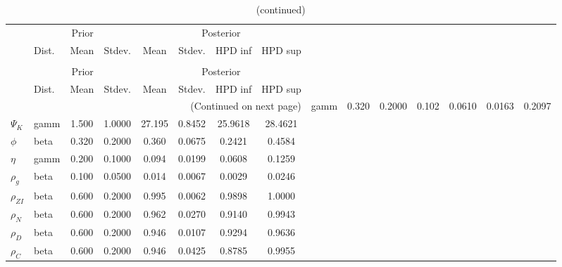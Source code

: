  
\begin{center}
\begin{longtable}{llcccccc} 
\caption{Results from Metropolis-Hastings (parameters)}
 \label{Table:MHPosterior:1}\\
\toprule 
  & \multicolumn{3}{c}{Prior}  &  \multicolumn{4}{c}{Posterior} \\
  \cmidrule(r{.75em}){2-4} \cmidrule(r{.75em}){5-8}
  & Dist. & Mean  & Stdev. & Mean & Stdev. & HPD inf & HPD sup\\
\midrule \endfirsthead 
\caption{(continued)}\\\toprule 
  & \multicolumn{3}{c}{Prior}  &  \multicolumn{4}{c}{Posterior} \\
  \cmidrule(r{.75em}){2-4} \cmidrule(r{.75em}){5-8}
  & Dist. & Mean  & Stdev. & Mean & Stdev. & HPD inf & HPD sup\\
\midrule \endhead 
\bottomrule \multicolumn{8}{r}{(Continued on next page)} \endfoot 
\bottomrule \endlastfoot 
${\sigma_a}$ & gamm &   0.320 & 0.2000 &   0.102& 0.0610 &  0.0163 &  0.2097 \\ 
${\Psi_K}$ & gamm &   1.500 & 1.0000 &  27.195& 0.8452 & 25.9618 & 28.4621 \\ 
${\phi}$ & beta &   0.320 & 0.2000 &   0.360& 0.0675 &  0.2421 &  0.4584 \\ 
${\eta}$ & gamm &   0.200 & 0.1000 &   0.094& 0.0199 &  0.0608 &  0.1259 \\ 
${\rho_g}$ & beta &   0.100 & 0.0500 &   0.014& 0.0067 &  0.0029 &  0.0246 \\ 
${\rho_{ZI}}$ & beta &   0.600 & 0.2000 &   0.995& 0.0062 &  0.9898 &  1.0000 \\ 
${\rho_N}$ & beta &   0.600 & 0.2000 &   0.962& 0.0270 &  0.9140 &  0.9943 \\ 
${\rho_D}$ & beta &   0.600 & 0.2000 &   0.946& 0.0107 &  0.9294 &  0.9636 \\ 
${\rho_C}$ & beta &   0.600 & 0.2000 &   0.946& 0.0425 &  0.8785 &  0.9955 \\ 
\end{longtable}
 \end{center}
